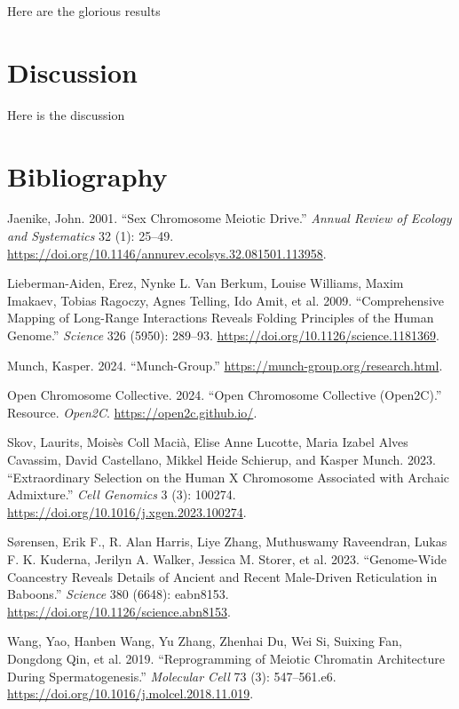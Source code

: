 \documentclass[
  a4paper,
]{scrbook}
\newlength{\cslhangindent}
\newenvironment{CSLReferences}[2] %
 {\begin{list}{}{%
  \setlength{\itemindent}{0pt}
  \setlength{\leftmargin}{0pt}
  \setlength{\parsep}{0pt}
  \ifodd #1
   \setlength{\leftmargin}{\cslhangindent}
   \setlength{\itemindent}{-1\cslhangindent}
  \fi
  \setlength{\itemsep}{#2\baselineskip}}}
 {\end{list}}
\let\oldemph\emph
\renewcommand\emph[1]{\oldemph{\color{gray}#1}}
\begin{document}
Here are the glorious results

\newpage{}

\chapter{Discussion}\label{discussion}

Here is the discussion

\newpage{}

\chapter*{Bibliography}\label{bibliography}

\begingroup
\raggedright

\label{refs}
\begin{CSLReferences}{1}{0}
Jaenike, John. 2001. {``Sex {Chromosome} {Meiotic} {Drive}.''}
\emph{Annual Review of Ecology and Systematics} 32 (1): 25--49.
\url{https://doi.org/10.1146/annurev.ecolsys.32.081501.113958}.

Lieberman-Aiden, Erez, Nynke L. Van Berkum, Louise Williams, Maxim
Imakaev, Tobias Ragoczy, Agnes Telling, Ido Amit, et al. 2009.
{``Comprehensive {Mapping} of {Long}-{Range} {Interactions} {Reveals}
{Folding} {Principles} of the {Human} {Genome}.''} \emph{Science} 326
(5950): 289--93. \url{https://doi.org/10.1126/science.1181369}.

Munch, Kasper. 2024. {``Munch-Group.''}
\url{https://munch-group.org/research.html}.

Open Chromosome Collective. 2024. {``Open {Chromosome} {Collective}
({Open2C}).''} Resource. \emph{Open2C}. \url{https://open2c.github.io/}.

Skov, Laurits, Moisès Coll Macià, Elise Anne Lucotte, Maria Izabel Alves
Cavassim, David Castellano, Mikkel Heide Schierup, and Kasper Munch.
2023. {``Extraordinary Selection on the Human {X} Chromosome Associated
with Archaic Admixture.''} \emph{Cell Genomics} 3 (3): 100274.
\url{https://doi.org/10.1016/j.xgen.2023.100274}.

Sørensen, Erik F., R. Alan Harris, Liye Zhang, Muthuswamy Raveendran,
Lukas F. K. Kuderna, Jerilyn A. Walker, Jessica M. Storer, et al. 2023.
{``Genome-Wide Coancestry Reveals Details of Ancient and Recent
Male-Driven Reticulation in Baboons.''} \emph{Science} 380 (6648):
eabn8153. \url{https://doi.org/10.1126/science.abn8153}.

Wang, Yao, Hanben Wang, Yu Zhang, Zhenhai Du, Wei Si, Suixing Fan,
Dongdong Qin, et al. 2019. {``Reprogramming of {Meiotic} {Chromatin}
{Architecture} During {Spermatogenesis}.''} \emph{Molecular Cell} 73
(3): 547--561.e6. \url{https://doi.org/10.1016/j.molcel.2018.11.019}.

\end{CSLReferences}

\endgroup


\backmatter
\end{document}
